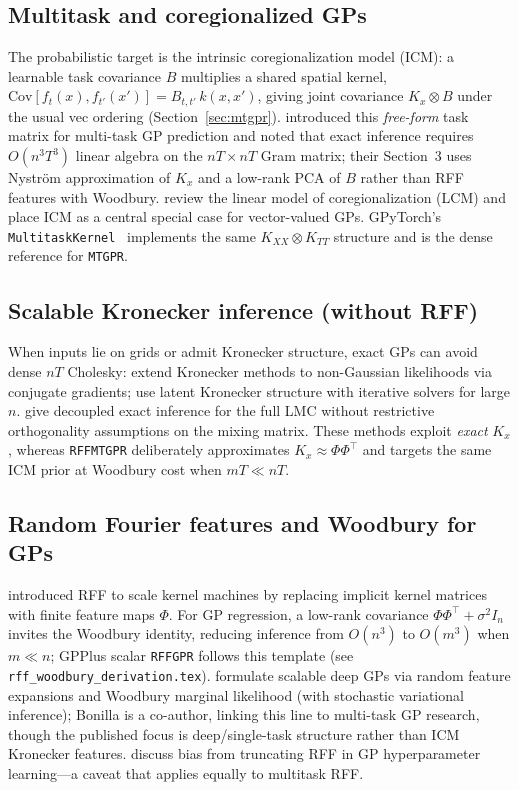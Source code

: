 \documentclass[11pt]{article}
\theoremstyle{plain}
\newcommand{\noise}{\sigma^2}
\newcommand{\Ph}{\Phi}
\begin{document}
\subsection{Multitask and coregionalized GPs}
\label{sec:lit-icm}

The probabilistic target is the intrinsic coregionalization model (ICM): a learnable task
covariance $B$ multiplies a shared spatial kernel,
$\mathrm{Cov}[f_t(x), f_{t'}(x')] = B_{t,t'}\, k(x,x')$,
giving joint covariance $K_x \otimes B$ under the usual vec ordering
(Section~\ref{sec:mtgpr}).
\citet{bonilla2008mtgp} introduced this \emph{free-form} task matrix for multi-task GP prediction
and noted that exact inference requires $O(n^3 T^3)$ linear algebra on the $nT \times nT$
Gram matrix; their Section~3 uses Nystr\"om approximation of $K_x$ and a low-rank PCA of $B$
rather than RFF features with Woodbury.
\citet{alvarez2012kernels} review the linear model of coregionalization (LCM) and place ICM as
a central special case for vector-valued GPs.
GPyTorch's \texttt{MultitaskKernel}~\citep{gardner2018gpytorch} implements the same
$K_{XX} \otimes K_{TT}$ structure and is the dense reference for \texttt{MTGPR}.

\subsection{Scalable Kronecker inference (without RFF)}

When inputs lie on grids or admit Kronecker structure, exact GPs can avoid dense $nT$ Cholesky:
\citet{wilson2015kronecker} extend Kronecker methods to non-Gaussian likelihoods via conjugate
gradients; \citet{lin2025latentkronecker} use latent Kronecker structure with iterative solvers
for large $n$.
\citet{leroy2023lmc} give decoupled exact inference for the full LMC without restrictive
orthogonality assumptions on the mixing matrix.
These methods exploit \emph{exact} $K_x$, whereas \texttt{RFFMTGPR} deliberately approximates
$K_x \approx \Ph\Ph^\top$ and targets the same ICM prior at Woodbury cost when $mT \ll nT$.

\subsection{Random Fourier features and Woodbury for GPs}

\citet{rahimi2007rff} introduced RFF to scale kernel machines by replacing implicit kernel
matrices with finite feature maps $\Ph$.
For GP regression, a low-rank covariance $\Ph\Ph^\top + \noise I_n$ invites the Woodbury
identity, reducing inference from $O(n^3)$ to $O(m^3)$ when $m \ll n$; GPPlus scalar
\texttt{RFFGPR} follows this template (see \texttt{rff\_woodbury\_derivation.tex}).
\citet{cutajar2017dgp} formulate scalable deep GPs via random feature expansions and Woodbury
marginal likelihood (with stochastic variational inference); Bonilla is a co-author, linking
this line to multi-task GP research, though the published focus is deep/single-task structure
rather than ICM Kronecker features.
\citet{potapczynski2021rfftrunc} discuss bias from truncating RFF in GP hyperparameter learning---a
caveat that applies equally to multitask RFF.
\end{document}
